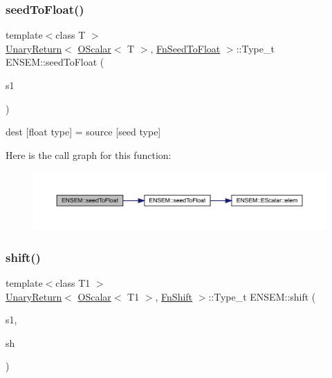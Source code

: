 \subsubsection{\texorpdfstring{seedToFloat()}{seedToFloat()}}
{\footnotesize\ttfamily template$<$class T $>$ \\
\mbox{\hyperlink{structENSEM_1_1UnaryReturn}{Unary\+Return}}$<$ \mbox{\hyperlink{classENSEM_1_1OScalar}{O\+Scalar}}$<$ T $>$, \mbox{\hyperlink{structENSEM_1_1FnSeedToFloat}{Fn\+Seed\+To\+Float}} $>$\+::Type\+\_\+t E\+N\+S\+E\+M\+::seed\+To\+Float (\begin{DoxyParamCaption}\item[{const \mbox{\hyperlink{classENSEM_1_1OScalar}{O\+Scalar}}$<$ T $>$ \&}]{s1 }\end{DoxyParamCaption})\hspace{0.3cm}{\ttfamily [inline]}}



dest \mbox{[}float type\mbox{]} = source \mbox{[}seed type\mbox{]} 

Here is the call graph for this function\+:\nopagebreak
\begin{figure}[H]
\begin{center}
\leavevmode
\includegraphics[width=350pt]{d1/d71/group__obsscalar_gad5154b123a75f53178134d8518242639_cgraph}
\end{center}
\end{figure}
\mbox{\label{group__obsscalar_ga2baf234651cfec54ad620a11e79d6ac6}} 
\subsubsection{\texorpdfstring{shift()}{shift()}}
{\footnotesize\ttfamily template$<$class T1 $>$ \\
\mbox{\hyperlink{structENSEM_1_1UnaryReturn}{Unary\+Return}}$<$ \mbox{\hyperlink{classENSEM_1_1OScalar}{O\+Scalar}}$<$ T1 $>$, \mbox{\hyperlink{structENSEM_1_1FnShift}{Fn\+Shift}} $>$\+::Type\+\_\+t E\+N\+S\+E\+M\+::shift (\begin{DoxyParamCaption}\item[{const \mbox{\hyperlink{classENSEM_1_1OScalar}{O\+Scalar}}$<$ T1 $>$ \&}]{s1,  }\item[{int}]{sh }\end{DoxyParamCaption})\hspace{0.3cm}{\ttfamily [inline]}}

